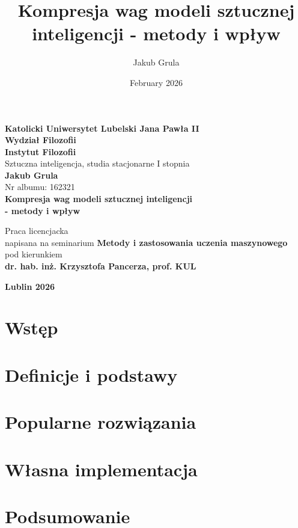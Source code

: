 \documentclass{book}
\title{Kompresja wag modeli sztucznej inteligencji - metody i wpływ}
\author{Jakub Grula}
\date{February 2026}
\begin{document}
\begin{titlepage}
    \centering
    \textbf{\Large Katolicki Uniwersytet Lubelski Jana Pawła II}\\[0.5cm]
    \textbf{\Large Wydział Filozofii}\\[0.5cm]
    \textbf{\Large Instytut Filozofii}\\[2.5cm]
    
    \Large{Sztuczna inteligencja, studia stacjonarne I stopnia}\\[2cm]
    
    \textbf{\Large Jakub Grula}\\[0.5cm]
    \Large{Nr albumu: 162321}\\[2.5cm]
    
    \textbf{\LARGE Kompresja wag modeli sztucznej inteligencji\\ - metody i wpływ}\\

    \vfill
    
    \begin{flushright}
    {
        \Large{Praca licencjacka}\\[0.1cm]
        \Large{napisana na seminarium} 
        \textbf{\Large Metody i zastosowania uczenia maszynowego}\\[0.1cm]
        \Large{pod kierunkiem}\\[0.1cm]
        \textbf{\Large dr. hab. inż. Krzysztofa Pancerza, prof. KUL}\\[3.5cm]
        }
    \end{flushright}

    
    \textbf{\Large Lublin 2026}\\[1cm]
\end{titlepage}

\tableofcontents
\chapter{Wstęp}

\chapter{Definicje i podstawy}

\chapter{Popularne rozwiązania}

\chapter{Własna implementacja}

\chapter{Podsumowanie}

\nocite{*}
\printbibliography[heading=bibintoc,title={Bibliografia}]
\listoftables
\listoffigures
\end{document}
